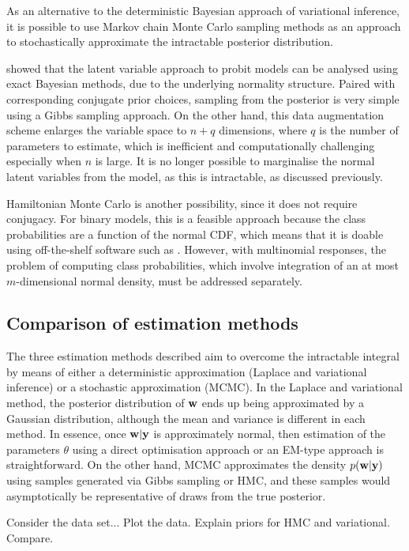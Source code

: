 As an alternative to the deterministic Bayesian approach of variational inference, it is possible to use Markov chain Monte Carlo sampling methods as an approach to stochastically approximate the intractable posterior distribution.

\citet{albert1993bayesian} showed that the latent variable approach to probit models can be analysed using exact Bayesian methods, due to the underlying normality structure.
Paired with corresponding conjugate prior choices, sampling from the posterior is very simple using a Gibbs sampling approach.
On the other hand, this data augmentation scheme enlarges the variable space to $n+q$ dimensions, where $q$ is the number of parameters to estimate, which is inefficient and computationally challenging especially when $n$ is large.
It is no longer possible to marginalise the normal latent variables from the model, as this is intractable, as discussed previously.

Hamiltonian Monte Carlo is another possibility, since it does not require conjugacy.
For binary models, this is a feasible approach because the class probabilities are a function of the normal CDF, which means that it is doable using off-the-shelf software such as .
However, with multinomial responses, the problem of computing class probabilities, which involve integration of an at most $m$-dimensional normal density, must be addressed separately.


\subsection{Comparison of estimation methods}


The three estimation methods described aim to overcome the intractable integral by means of either a deterministic approximation (Laplace and variational inference) or a stochastic approximation (MCMC).
In the Laplace and variational method, the posterior distribution of ${\mathbf w}$ ends up being approximated by a Gaussian distribution, although the mean and variance is different in each method.
In essence, once ${\mathbf w}|{\mathbf y}$ is approximately normal, then estimation of the parameters $\theta$ using a direct optimisation approach or an EM-type approach is straightforward.
On the other hand, MCMC approximates the density $p({\mathbf w}|{\mathbf y})$ using samples generated via Gibbs sampling or HMC, and these samples would asymptotically be representative of draws from the true posterior.

Consider the data set...
Plot the data. Explain priors for HMC and variational. Compare.



